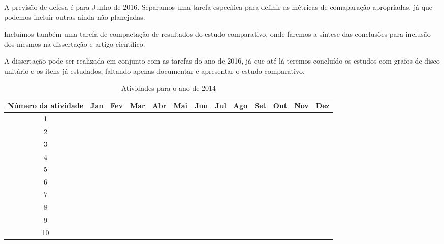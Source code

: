 A previsão de defesa é para Junho de 2016. Separamos uma tarefa específica para definir as métricas de comaparação apropriadas, já que podemos incluir outras ainda não planejadas.

Incluímos também uma tarefa de compactação de resultados do estudo comparativo, onde faremos a síntese das conclusões para inclusão dos mesmos na dissertação e artigo científico.

A dissertação pode ser realizada em conjunto com as tarefas do ano de 2016, já que até lá teremos concluído os estudos com grafos de disco unitário e os itens já estudados, faltando apenas documentar e apresentar o estudo comparativo.

\begin{table}[]
\centering
\caption{Atividades para o ano de 2014}
\label{tab:act2014}
\begin{tabular}{|c|l|l|l|l|l|l|l|l|l|l|l|l|}
\hline
Número da atividade & Jan &  Fev & Mar & Abr & Mai & Jun & Jul & Ago & Set & Out & Nov & Dez \\ \hline
1& & \cellcolor[HTML]{343434}   & \cellcolor[HTML]{343434}  & \cellcolor[HTML]{343434} & \cellcolor[HTML]{343434}  & \cellcolor[HTML]{343434} & \cellcolor[HTML]{343434} &  \cellcolor[HTML]{343434} & \cellcolor[HTML]{343434} & \cellcolor[HTML]{343434} & \cellcolor[HTML]{343434} & \cellcolor[HTML]{343434}  \\ \hline
2& & \cellcolor[HTML]{343434}  & \cellcolor[HTML]{343434}   & \cellcolor[HTML]{343434}  & \cellcolor[HTML]{343434}  & \cellcolor[HTML]{343434}  & \cellcolor[HTML]{343434}  & \cellcolor[HTML]{343434}  & \cellcolor[HTML]{343434}  & \cellcolor[HTML]{343434}  & \cellcolor[HTML]{343434}  & \cellcolor[HTML]{343434}  \\ \hline
3& &  &  &  &  &  &  &  &  &  &  &  \\ \hline
4& &  &  &  &  &  &  &  &  &  &  &  \\ \hline
5& &  &  &  &  &  &  &  &  &  &  &  \\ \hline
6& &  &  &  &  &  &  &  &  &  &  &  \\ \hline
7& &  &  &  &  &  &  &  &  &  &  &  \\ \hline
8& &  &  &  &  &  &  &  &  &  &  &  \\ \hline
9& &  &  &  &  &  &  &  &  &  &  &  \\ \hline
10& &  &  &  &  &  &  &  &  &  &  &  \\ \hline
\end{tabular}
\end{table}

